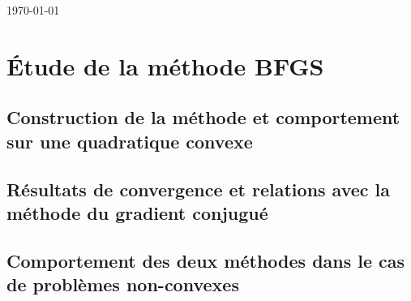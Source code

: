 \documentclass[10pt,a4paper]{article}
\makeatletter
\def\cleardoublepage{\clearpage\if@twoside \ifodd\c@page\else%
  \hbox{}%
  \thispagestyle{empty}%
  \newpage%
  \if@twocolumn\hbox{}\newpage\fi\fi\fi}
\theoremstyle{definition}
\theoremstyle{plain}
\theoremstyle{remark}
\makeatother
\begin{document}
\begin{titlepage}
\begin{center}
\vfill

{\today}

\end{center}
\end{titlepage}







\clearpage
\tableofcontents










\cleardoublepage
\section{Étude de la méthode BFGS} 

\subsection{Construction de la méthode et comportement sur une quadratique convexe}

\subsection{Résultats de convergence et relations avec la méthode du gradient conjugué}

\subsection{Comportement des deux méthodes dans le cas de problèmes non-convexes}
\end{document}
